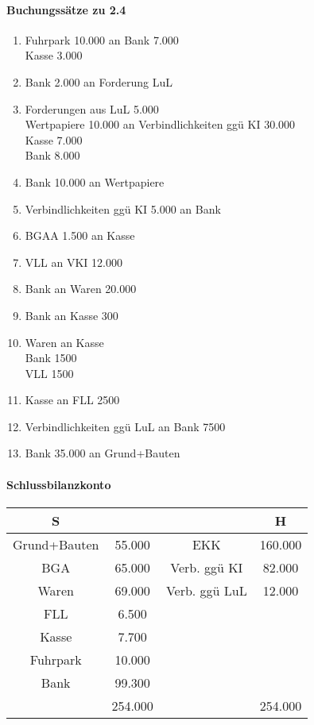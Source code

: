\documentclass[paper=a4, fontsize=11pt]{scrartcl}
\numberwithin{equation}{section}
\numberwithin{figure}{section}
\numberwithin{table}{section}
\begin{document}
\paragraph{Buchungssätze zu 2.4}
\begin{enumerate}
\item Fuhrpark 10.000 an Bank 7.000 \\
Kasse 3.000
\item Bank 2.000 an Forderung LuL
\item Forderungen aus LuL 5.000 \\
Wertpapiere 10.000 an Verbindlichkeiten ggü KI 30.000 \\
Kasse 7.000 \\
Bank 8.000
\item Bank 10.000 an Wertpapiere
\item Verbindlichkeiten ggü KI 5.000 an Bank 
\item BGAA 1.500 an Kasse
\item VLL an VKI 12.000
\item Bank an Waren 20.000
\item Bank an Kasse 300
\item Waren an Kasse \\
Bank 1500 \\
VLL 1500
\item Kasse an FLL 2500
\item Verbindlichkeiten ggü LuL an Bank 7500
\item Bank 35.000 an Grund+Bauten
\end{enumerate}

\paragraph{Schlussbilanzkonto}
\begin{tabular}{cc|cc}
S & & & H \\\hline
Grund+Bauten & 55.000 & EKK & 160.000 \\
BGA & 65.000 & Verb. ggü KI & 82.000 \\
Waren & 69.000 & Verb. ggü LuL & 12.000 \\
FLL & 6.500 & & \\
Kasse & 7.700 & & \\ 
Fuhrpark & 10.000 & & \\         
Bank & 99.300 & & \\\hline
 & 254.000 & & 254.000 \\\hline
\end{tabular}
\end{document}
